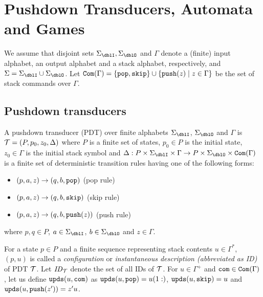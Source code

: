 \section{Pushdown Transducers, Automata and Games}
We assume that disjoint sets $\Sigma_\dblI, \Sigma_\dblO$ and $\Gamma$ denote
a (finite) input alphabet, an output alphabet and a stack alphabet, respectively,
and $\Sigma = \Sigma_\dblI \cup \Sigma_\dblO$.
Let $\mathtt{Com}(\Gamma) = \{\mathtt{pop},\mathtt{skip}\}\cup\{\mathtt{push}(z)\mid z\in \Gamma\}$ be the set of stack commands over $\Gamma$.

\subsection{Pushdown transducers}
\begin{definition}
A {pushdown transducer} (PDT)
over finite alphabets $\Sigma_\dblI$, $\Sigma_\dblO$ and $\Gamma$
is ${\cal T}=(P, p_0, z_0, \Delta)$ where
$P$ is a finite set of states,
$p_0\in P$ is the initial state,
$z_0\in \Gamma$ is the initial stack symbol and
$\Delta: P\times \Sigma_\dblI \times \Gamma \to P\times \Sigma_\dblO \times \Com(\Gamma)$ is a finite set of deterministic transition rules having one of the following forms:
\begin{itemize}
\item $(p, a, z) \rightarrow (q, b, \mathtt{pop})$ \quad (pop rule)
\item $(p, a, z) \rightarrow (q, b, \mathtt{skip})$ \quad (skip rule)
\item $(p, a, z) \rightarrow (q, b, \mathtt{push}(z))$ \quad (push rule)
\end{itemize}
where $p, q\in P$, $a\in\Sigma_\dblI$, $b\in\Sigma_\dblO$ and $z\in\Gamma$.
\end{definition}
\noindent
For a state $p\in P$ and
a finite sequence representing stack contents $u \in \Gamma^*$,
$(p, u)$ is called
a {\em configuration} or {\em instantaneous description (abbreviated as ID)} of PDT ${\cal T}$. Let $\mathit{ID}_{\cal T}$ denote the set of all IDs of ${\cal T}$.
For $u\in\Gamma^+$ and $\mathtt{com}\in\mathtt{Com}(\Gamma)$, let us define $\mathtt{upds}(u,\mathtt{com})$
as $\mathtt{upds}(u,\mathtt{pop})=u(1:)$, $\mathtt{upds}(u,\mathtt{skip})=u$ and $\mathtt{upds}(u,\mathtt{push}(z'))=z'u$.

